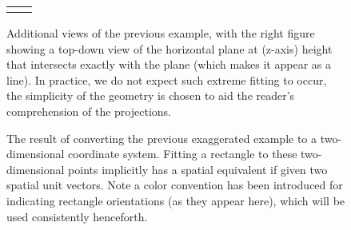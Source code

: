 \begin{figure}[!h]
\begin{center}
	\begin{tabular}[!ht]{C{0.5\linewidth}C{0.5\linewidth}} 

	&
	\end{tabular}
	\caption{Additional views of the previous example, with the right figure showing a top-down view of the horizontal plane at (z-axis) height that intersects exactly with the plane (which makes it appear as a line). In practice, we do not expect such extreme fitting to occur, the simplicity of the geometry is chosen to aid the reader's comprehension of the projections.}
	\label{fig:planeProjectNoFit2}
\end{center}
\end{figure}

%
%		


\begin{figure}[!h]
	\begin{center}
		\caption{The result of converting the previous exaggerated example to a two-dimensional coordinate system. Fitting a rectangle to these two-dimensional points implicitly has a spatial equivalent if given two spatial unit vectors. Note a color convention has been introduced for indicating rectangle orientations (as they appear here), which will be used consistently henceforth.}
		\label{fig:dimRedictNoFit}
	\end{center}
\end{figure}


